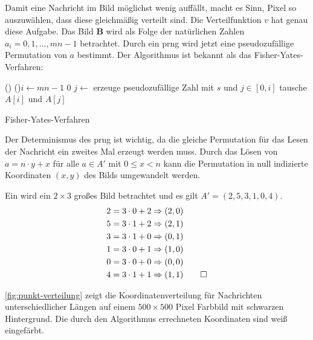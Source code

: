 \noindent
Damit eine Nachricht im Bild möglichst wenig auffällt, macht es Sinn, Pixel
so auszuwählen, dass diese gleichmäßig verteilt sind. Die Verteilfunktion $v$ hat genau diese
Aufgabe. Das Bild $\mathbf{B}$ wird als Folge der natürlichen Zahlen
$a_i = 0,1,\ldots,mn - 1$ betrachtet.
Durch ein \acs{prng} wird jetzt
eine pseudozufällige Permutation von $a$ bestimmt. Der Algorithmus ist bekannt
als das Fisher-Yates-Verfahren:

\begin{singlespace}
  \begin{algorithm}[h]
    \DontPrintSemicolon
    \Begin(){
      \For(){$i \leftarrow mn - 1$ \KwTo $0$}{
        $j \leftarrow$ erzeuge pseudozufällige Zahl mit $s$ und $j \in [0,i]$\;
        tausche $A[i]$ und $A[j]$\;
      }
      \;
    }
    \caption{Fisher-Yates-Verfahren}
    \label{alg:fisher-yates-verfahren}
  \end{algorithm}
\end{singlespace}


\noindent
Der Determinismus des \acs{prng} ist wichtig, da die gleiche Permutation
für das Lesen der Nachricht ein zweites Mal erzeugt werden muss.
Durch das Lösen von $a = n \cdot y + x$ für alle $a \in A'$ mit $0 \leq x < n$
kann die Permutation in null indizierte Koordinaten $(x,y)$ des Bilds umgewandelt werden.
\begin{example}
  Ein wird ein $2 \times 3$ großes Bild betrachtet und es gilt $A' = (2,5,3,1,0,4)$.
  \begin{align*}
    2 & = 3 \cdot 0 + 2 \Rightarrow (2,0)          \\
    5 & = 3 \cdot 1 + 2 \Rightarrow (2,1)          \\
    3 & = 3 \cdot 1 + 0 \Rightarrow (0,1)          \\
    1 & = 3 \cdot 0 + 1 \Rightarrow (1,0)          \\
    0 & = 3 \cdot 0 + 0 \Rightarrow (0,0)          \\
    4 & = 3 \cdot 1 + 1 \Rightarrow (1,1) \qedhere
  \end{align*}
\end{example}

\noindent
\autoref{fig:punkt-verteilung} zeigt die Koordinatenverteilung für Nachrichten unterschiedlicher
Längen auf einem $500 \times 500$ Pixel Farbbild mit schwarzen Hintergrund. Die durch den Algorithmus
errechneten Koordinaten sind weiß eingefärbt.

